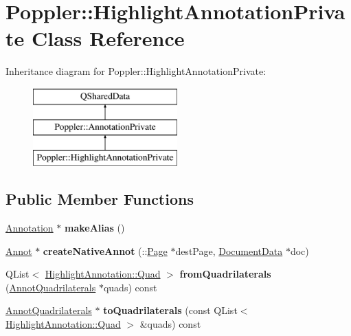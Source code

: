 \hypertarget{class_poppler_1_1_highlight_annotation_private}{}\section{Poppler\+:\+:Highlight\+Annotation\+Private Class Reference}
\label{class_poppler_1_1_highlight_annotation_private}
Inheritance diagram for Poppler\+:\+:Highlight\+Annotation\+Private\+:\begin{figure}[H]
\begin{center}
\leavevmode
\includegraphics[height=3.000000cm]{class_poppler_1_1_highlight_annotation_private}
\end{center}
\end{figure}
\subsection*{Public Member Functions}
\begin{DoxyCompactItemize}
\item 
\mbox{\label{class_poppler_1_1_highlight_annotation_private_a2deb76574a999aabf6318770fe809af8}} 
\hyperlink{class_poppler_1_1_annotation}{Annotation} $\ast$ {\bfseries make\+Alias} ()
\item 
\mbox{\label{class_poppler_1_1_highlight_annotation_private_ad1297260f2c1011566c599cc03a32709}} 
\hyperlink{class_annot}{Annot} $\ast$ {\bfseries create\+Native\+Annot} (\+::\hyperlink{class_poppler_1_1_page}{Page} $\ast$dest\+Page, \hyperlink{class_poppler_1_1_document_data}{Document\+Data} $\ast$doc)
\item 
\mbox{\label{class_poppler_1_1_highlight_annotation_private_af02dc839493b0b2f5a505f36f6d6e9a0}} 
Q\+List$<$ \hyperlink{struct_poppler_1_1_highlight_annotation_1_1_quad}{Highlight\+Annotation\+::\+Quad} $>$ {\bfseries from\+Quadrilaterals} (\hyperlink{class_annot_quadrilaterals}{Annot\+Quadrilaterals} $\ast$quads) const
\item 
\mbox{\label{class_poppler_1_1_highlight_annotation_private_a991a27bb1e1023da1c9911b6eb3ed33c}} 
\hyperlink{class_annot_quadrilaterals}{Annot\+Quadrilaterals} $\ast$ {\bfseries to\+Quadrilaterals} (const Q\+List$<$ \hyperlink{struct_poppler_1_1_highlight_annotation_1_1_quad}{Highlight\+Annotation\+::\+Quad} $>$ \&quads) const
\end{DoxyCompactItemize}
